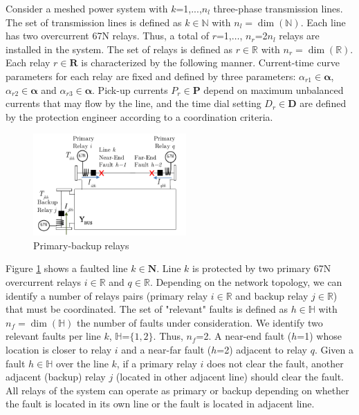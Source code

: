 \documentclass[letterpaper, 10 pt, conference]{IEEEtran}
\begin{document}
 Consider a meshed power system with $k$=1,...,$n_l$ three-phase transmission lines. The set of transmission lines is defined as $k\in \mathds{N}$ with $n_l=\dim{(\mathds{N})}$. Each line has two overcurrent 67N relays. Thus, a  total of $r$=1,$\ldots$, $n_r$=2$n_l$ relays are installed in the system. The set of relays is defined as $r\in \mathds{R}$ with $n_r=\dim{(\mathds{R})}$. Each relay  $r\in \mathbf{R}$ is characterized by the following manner. Current-time curve parameters for each relay are fixed and defined by three parameters: $\alpha_{r1}\in \bm {\alpha}$,  $\alpha_{r2}\in \bm {\alpha}$ and $\alpha_{r3}\in \bm {\alpha}$. Pick-up currents $P_r \in \bm {P}$
 depend on maximum unbalanced currents that may flow by the line, and  the time dial setting $D_r\in \bm {D}$ are defined by the protection engineer according to a coordination criteria.
\begin{figure}[t] \centerline{
     \includegraphics[width=2.3in]{images/main-backup.pdf}}
       \caption{Primary-backup relays}
      \label{main}
        \end{figure}

Figure \ref{main} shows a faulted line $k\in \mathbf{N}$. Line $k$ is protected by two primary  67N overcurrent relays $i\in \mathds{R}$ and $q\in \mathds{R}$. Depending on the network topology, we can identify a number of relays pairs (primary relay $i\in \mathds{R}$ and backup relay $j\in \mathds{R}$) that must be coordinated.
The set of "relevant" faults is defined as $h\in \mathds{H}$ with $n_f=\dim{(\mathds{H})}$ the number of faults under consideration. We identify two relevant faults per line $k$, $\mathds{H}$=$\{1,2\}$. Thus, $n_f$=2. A near-end fault ($h$=1) whose location is closer to relay $i$ and a near-far fault ($h$=2) adjacent to relay $q$. Given a fault $h\in \mathds{H}$ over the line $k$, if a primary relay $i$ does not clear the fault, another adjacent (backup) relay $j$ (located in other adjacent line) should clear the fault. All relays of the system can operate as primary or backup depending on whether the fault is located in its own line or the fault is located in adjacent line.
\end{document}
